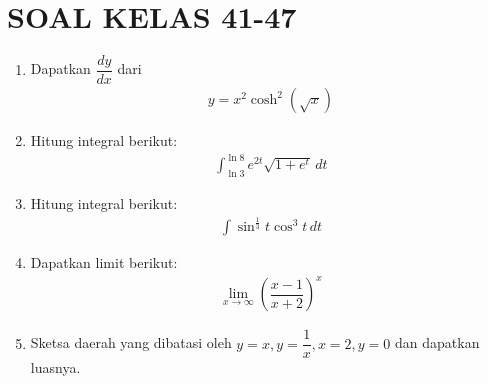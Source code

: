\documentclass{article}
\begin{document}
\section*{SOAL KELAS 41-47}
\begin{enumerate}
	\item Dapatkan $\dfrac{dy}{dx}$ dari 
	\begin{align*}
	y = x^2\cosh^2(\sqrt{x})
	\end{align*}
	\item Hitung integral berikut:
	\begin{align*}
	\int_{\ln 3}^{\ln 8} e^{2t} \sqrt{1+e^t}\, dt
	\end{align*}
	\item Hitung integral berikut:
	\begin{align*}
	\int \sin^{\frac{1}{3}} t\cos^3 t\, dt
	\end{align*}
	\item Dapatkan limit berikut:
	\begin{align*}
	\lim_{x\rightarrow \infty} \left(\dfrac{x-1}{x+2}\right)^x
	\end{align*}
	\item Sketsa daerah yang dibatasi oleh $y=x,y=\dfrac{1}{x},x=2,y=0$ dan dapatkan luasnya.
\end{enumerate}
\end{document}
